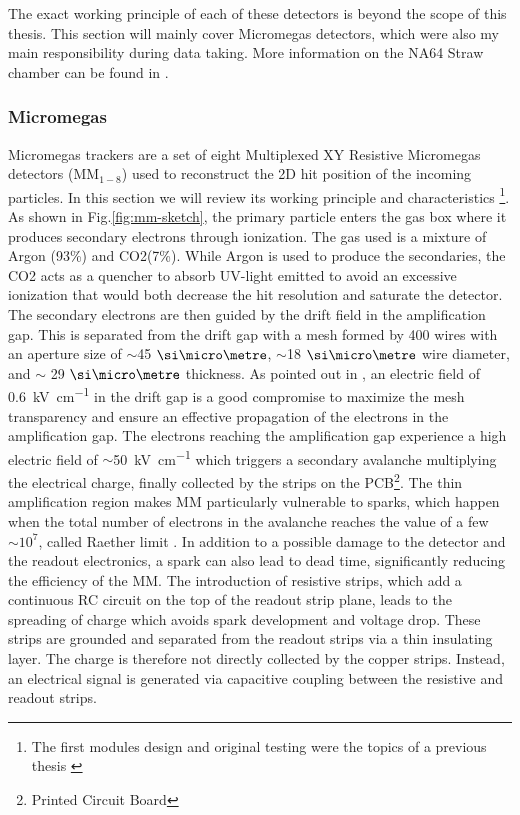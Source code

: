The exact working principle of each of these detectors is beyond the scope of this thesis. This section will mainly cover Micromegas detectors, which were also my main responsibility during data taking. More information on the NA64 Straw chamber can be found in \cite{pdegen-thesis}.

\subsubsection{Micromegas}

Micromegas trackers are a set of eight Multiplexed XY Resistive Micromegas detectors (MM$_{1-8}$) used to reconstruct the 2D hit position of the incoming particles. In this section we will review its working principle and characteristics \footnote{The first modules design and original testing were the topics of a previous thesis \cite{dbanerjee-thesis}}.
As shown in Fig.\ref{fig:mm-sketch}, the primary particle enters the gas box where it produces secondary electrons through ionization. The gas used is a mixture of Argon (93\%) and CO2(7\%). While Argon is used to produce the secondaries, the CO2 acts as a quencher to absorb UV-light emitted to avoid an excessive ionization that would both decrease the hit resolution and saturate the detector. The secondary electrons are then guided by the drift field in the amplification gap. This is separated from the drift gap with a mesh formed by 400 wires with an aperture size of $\sim$45 $\mum$, $\sim$18 $\mum$ wire diameter, and $\sim$ 29 $\mum$ thickness. As pointed out in \cite{Bortfeldt:2014vvt}, an electric field of \SI{0.6}{\kilo\volt\per\centi\metre} in the drift gap is a good compromise to maximize the mesh transparency and ensure an effective propagation of the electrons in the amplification gap. The electrons reaching the amplification gap experience a high electric field of $\sim$\SI{50}{\kilo\volt\per\centi\metre} which triggers a secondary avalanche multiplying the electrical charge, finally collected by the strips on the PCB\footnote{Printed Circuit Board}.
The thin amplification region makes MM particularly vulnerable to sparks, which happen when the total number of electrons in the avalanche reaches the value of a few $\sim 10^7$, called Raether limit \cite{BAY2002162,BRESSAN1999321,Raether:102989}. In addition to a possible damage to the detector and the readout electronics, a spark can also lead to dead time, significantly reducing the efficiency of the MM. The introduction of resistive strips, which add a continuous RC circuit on the top of the readout strip plane, leads to the spreading of charge which avoids spark development and voltage drop. These strips are grounded and separated from the readout strips via a thin insulating layer. The charge is therefore not directly collected by the copper strips. Instead, an electrical signal is generated via capacitive coupling between the resistive and readout strips.

